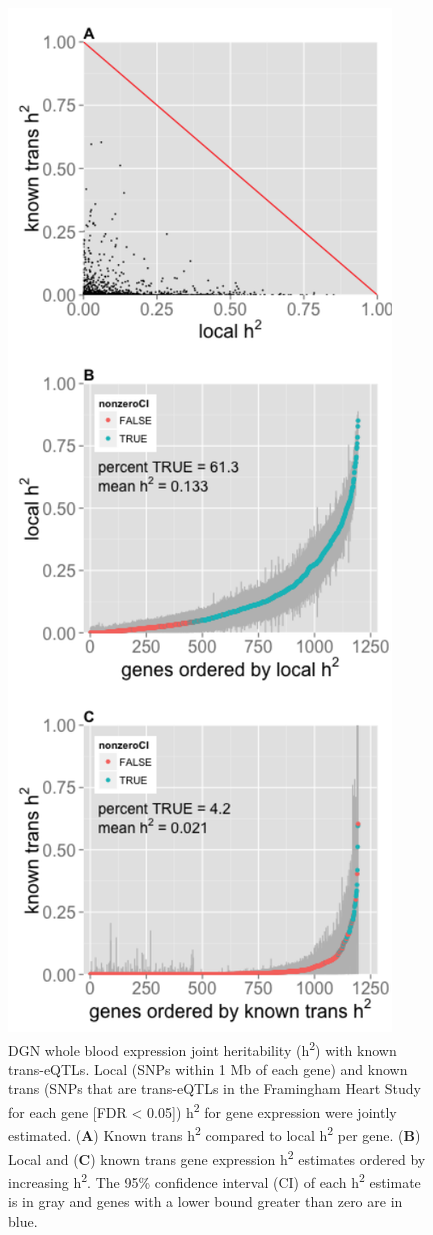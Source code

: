 \documentclass[]{article}
\begin{document}
\begin{figure}[htbp]
\centering
\includegraphics{GenArch_manuscript_files/figure-latex/transH2-1.pdf}
\caption{DGN whole blood expression joint heritability
(h\textsuperscript{2}) with known trans-eQTLs. Local (SNPs within 1 Mb
of each gene) and known trans (SNPs that are trans-eQTLs in the
Framingham Heart Study for each gene {[}FDR \textless{} 0.05{]})
h\textsuperscript{2} for gene expression were jointly estimated.
(\textbf{A}) Known trans h\textsuperscript{2} compared to local
h\textsuperscript{2} per gene. (\textbf{B}) Local and (\textbf{C}) known
trans gene expression h\textsuperscript{2} estimates ordered by
increasing h\textsuperscript{2}. The 95\% confidence interval (CI) of
each h\textsuperscript{2} estimate is in gray and genes with a lower
bound greater than zero are in blue.}
\end{figure}
\end{document}
